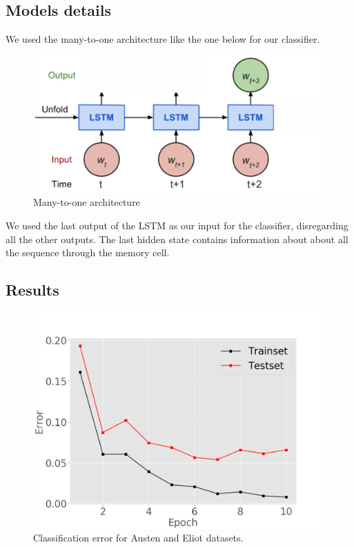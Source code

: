 
\subsection{Models details}

We used the many-to-one architecture like the one below for our 
classifier.
\begin{figure}[ht]
\vskip 0.2in
\begin{center}
\centerline{\includegraphics[width=\columnwidth]{manytoone}}
\caption{Many-to-one architecture}
\end{center}
\vskip -0.2in
\end{figure}
We used the last output of the LSTM as our input for the classifier, 
disregarding all the other outputs. The last hidden state contains 
information about about all the sequence through the memory cell. 

\subsection{Results}

\begin{figure}[ht]
\vskip 0.2in
\begin{center}
\centerline{\includegraphics[width=\columnwidth]{gejaclass}}
\caption{Classification error for Austen and Eliot datasets.}
\end{center}
\vskip -0.2in
\end{figure}

